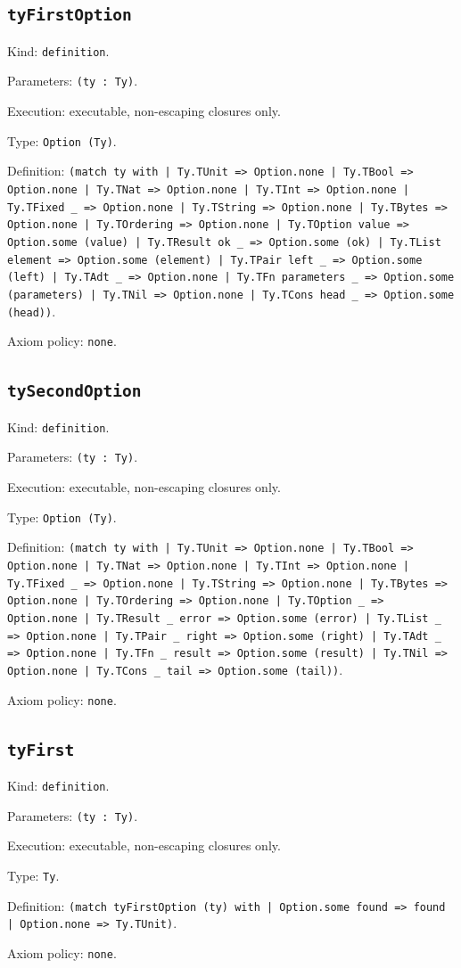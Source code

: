 \documentclass[11pt]{article}
\begin{document}
\subsection*{\texttt{tyFirstOption}}
\noindent Kind: \texttt{definition}.\par
\noindent Parameters: \texttt{(ty : Ty)}.\par
\noindent Execution: executable, non-escaping closures only.\par
\noindent Type: \texttt{Option (Ty)}.\par
\noindent Definition: \texttt{(match ty with | Ty.TUnit => Option.none | Ty.TBool => Option.none | Ty.TNat => Option.none | Ty.TInt => Option.none | Ty.TFixed \_ => Option.none | Ty.TString => Option.none | Ty.TBytes => Option.none | Ty.TOrdering => Option.none | Ty.TOption value => Option.some (value) | Ty.TResult ok \_ => Option.some (ok) | Ty.TList element => Option.some (element) | Ty.TPair left \_ => Option.some (left) | Ty.TAdt \_ => Option.none | Ty.TFn parameters \_ => Option.some (parameters) | Ty.TNil => Option.none | Ty.TCons head \_ => Option.some (head))}.\par
\noindent Axiom policy: \texttt{none}.\par
\subsection*{\texttt{tySecondOption}}
\noindent Kind: \texttt{definition}.\par
\noindent Parameters: \texttt{(ty : Ty)}.\par
\noindent Execution: executable, non-escaping closures only.\par
\noindent Type: \texttt{Option (Ty)}.\par
\noindent Definition: \texttt{(match ty with | Ty.TUnit => Option.none | Ty.TBool => Option.none | Ty.TNat => Option.none | Ty.TInt => Option.none | Ty.TFixed \_ => Option.none | Ty.TString => Option.none | Ty.TBytes => Option.none | Ty.TOrdering => Option.none | Ty.TOption \_ => Option.none | Ty.TResult \_ error => Option.some (error) | Ty.TList \_ => Option.none | Ty.TPair \_ right => Option.some (right) | Ty.TAdt \_ => Option.none | Ty.TFn \_ result => Option.some (result) | Ty.TNil => Option.none | Ty.TCons \_ tail => Option.some (tail))}.\par
\noindent Axiom policy: \texttt{none}.\par
\subsection*{\texttt{tyFirst}}
\noindent Kind: \texttt{definition}.\par
\noindent Parameters: \texttt{(ty : Ty)}.\par
\noindent Execution: executable, non-escaping closures only.\par
\noindent Type: \texttt{Ty}.\par
\noindent Definition: \texttt{(match tyFirstOption (ty) with | Option.some found => found | Option.none => Ty.TUnit)}.\par
\noindent Axiom policy: \texttt{none}.\par
\end{document}

